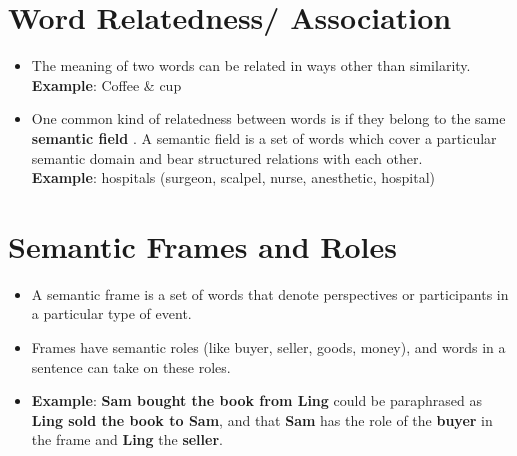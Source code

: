 \section{Word Relatedness/ Association \cite{nlp-1}}\label{Word Relatedness/ Association}
\begin{itemize}
    \item The meaning of two words can be related in ways other than similarity.\\
    \textbf{Example}: Coffee \& cup

    \item One common kind of relatedness between words is if they belong to the same \textbf{semantic field} . A semantic field is a set of words which cover a particular semantic domain and bear structured relations with each other.\\
    \textbf{Example}: hospitals (surgeon, scalpel, nurse, anesthetic, hospital)

\end{itemize}

\section{Semantic Frames and Roles \cite{nlp-1}} \label{Semantic Frames and Roles}
\begin{itemize}
    \item A semantic frame is a set of words that denote perspectives or participants in a particular type of event.

    \item Frames have semantic roles (like buyer, seller, goods, money), and words in a sentence can take on these roles.

    \item \textbf{Example}: \textbf{Sam bought the book from Ling} could be paraphrased as \textbf{Ling sold the book to Sam}, and that \textbf{Sam} has the role of the \textbf{buyer} in the frame and \textbf{Ling} the \textbf{seller}.
\end{itemize}

